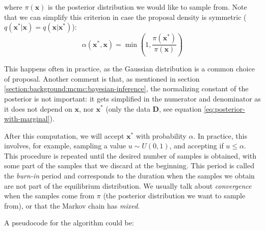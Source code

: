 \documentclass[12pt]{memoir}
\newcommand{\mb}{\mathbf}
\newcommand{\tb}{\textbf}
\newcommand{\ti}{\textit}
\begin{document}
where $\pi(\mb x)$ is the posterior distribution we would like to sample from. Note that we can simplify this criterion in case the proposal density is symmetric ($q(\mb x^*|\mb x) = q(\mb x|\mb x^*)$):
\begin{equation}
    \alpha(\mb x^*, \mb x) = \min\left(1, \frac{\pi(\mb x^*)}{\pi(\mb x)}\right)
\end{equation}

This happens often in practice, as the Gaussian distribution is a common choice of proposal. Another comment is that, as mentioned in section \ref{section:background:mcmc:bayesian-inference}, the normalizing constant of the posterior is not important: it gets simplified in the numerator and denominator as it does not depend on $\mb x$, nor $\mb x^*$ (only the data \tb D, see equation \ref{eq:posterior-with-marginal}). \medbreak


After this computation, we will accept $\mb x^*$ with probability $\alpha$. In practice, this involves, for example, sampling a value $u \sim U(0,1)$, and accepting if $ u \leq \alpha$. This procedure is repeated until the desired number of samples is obtained, with some part of the samples that we discard at the beginning. This period is called the \ti{burn-in} period and corresponds to the duration when the samples we obtain are not part of the equilibrium distribution. We usually talk about \textit{convergence} when the samples come from $\pi$ (the posterior distribution we want to sample from), or that the Markov chain has \textit{mixed}.\medbreak

A pseudocode for the algorithm could be:\medbreak
\end{document}
